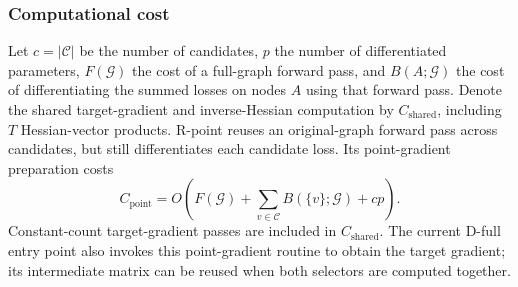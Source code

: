 \subsubsection{Computational cost}
\label{app:if-cost}

Let $c=|\mathcal C|$ be the number of candidates, $p$ the number of differentiated parameters, $F(\mathcal G)$ the cost of a full-graph forward pass, and $B(A;\mathcal G)$ the cost of differentiating the summed losses on nodes $A$ using that forward pass. Denote the shared target-gradient and inverse-Hessian computation by $C_{\mathrm{shared}}$, including $T$ Hessian-vector products. R-point reuses an original-graph forward pass across candidates, but still differentiates each candidate loss. Its point-gradient preparation costs
\begin{equation}
C_{\mathrm{point}}=
O\!\left(F(\mathcal G)+
\sum_{v\in\mathcal C} B(\{v\};\mathcal G)+cp\right).
\end{equation}
Constant-count target-gradient passes are included in $C_{\mathrm{shared}}$. The current D-full entry point also invokes this point-gradient routine to obtain the target gradient; its intermediate matrix can be reused when both selectors are computed together.

